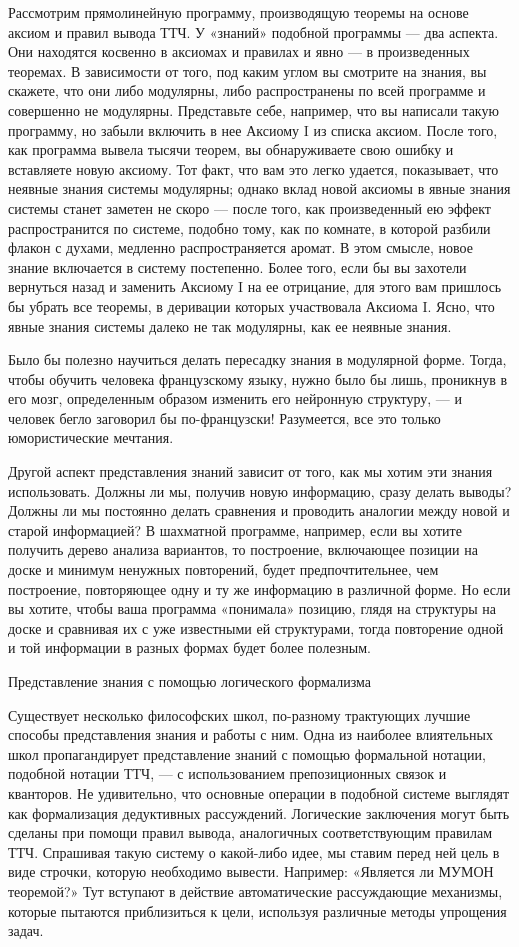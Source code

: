 Рассмотрим прямолинейную программу, производящую теоремы на основе аксиом и правил вывода ТТЧ. У «знаний» подобной программы --- два аспекта. Они находятся косвенно в аксиомах и правилах и явно --- в произведенных теоремах. В зависимости от того, под каким углом вы смотрите на знания, вы скажете, что они либо модулярны, либо распространены по всей программе и совершенно не модулярны. Представьте себе, например, что вы написали такую программу, но забыли включить в нее Аксиому I из списка аксиом. После того, как программа вывела тысячи теорем, вы обнаруживаете свою ошибку и вставляете новую аксиому. Тот факт, что вам это легко удается, показывает, что неявные знания системы модулярны; однако вклад новой аксиомы в явные знания системы станет заметен не скоро --- после того, как произведенный ею эффект распространится по системе, подобно тому, как по комнате, в которой разбили флакон с духами, медленно распространяется аромат. В этом смысле, новое знание включается в систему постепенно. Более того, если бы вы захотели вернуться назад и заменить Аксиому I на ее отрицание, для этого вам пришлось бы убрать все теоремы, в деривации которых участвовала Аксиома I. Ясно, что явные знания системы далеко не так модулярны, как ее неявные знания.

Было бы полезно научиться делать пересадку знания в модулярной форме. Тогда, чтобы обучить человека французскому языку, нужно было бы лишь, проникнув в его мозг, определенным образом изменить его нейронную структуру, --- и человек бегло заговорил бы по-французски! Разумеется, все это только юмористические мечтания.

Другой аспект представления знаний зависит от того, как мы хотим эти знания использовать. Должны ли мы, получив новую информацию, сразу делать выводы? Должны ли мы постоянно делать сравнения и проводить аналогии между новой и старой информацией? В шахматной программе, например, если вы хотите получить дерево анализа вариантов, то построение, включающее позиции на доске и минимум ненужных повторений, будет предпочтительнее, чем построение, повторяющее одну и ту же информацию в различной форме. Но если вы хотите, чтобы ваша программа «понимала» позицию, глядя на структуры на доске и сравнивая их с уже известными ей структурами, тогда повторение одной и той информации в разных формах будет более полезным.

Представление знания с помощью логического формализма

Существует несколько философских школ, по-разному трактующих лучшие способы представления знания и работы с ним. Одна из наиболее влиятельных школ пропагандирует представление знаний с помощью формальной нотации, подобной нотации ТТЧ, --- с использованием препозиционных связок и кванторов. Не удивительно, что основные операции в подобной системе выглядят как формализация дедуктивных рассуждений. Логические заключения могут быть сделаны при помощи правил вывода, аналогичных соответствующим правилам ТТЧ. Спрашивая такую систему о какой-либо идее, мы ставим перед ней цель в виде строчки, которую необходимо вывести. Например: «Является ли МУМОН теоремой?» Тут вступают в действие автоматические рассуждающие механизмы, которые пытаются приблизиться к цели, используя различные методы упрощения задач.

